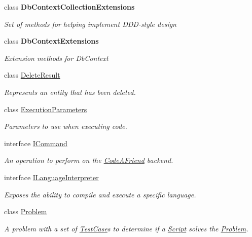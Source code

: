 \begin{DoxyCompactItemize}
\item 
class {\bfseries Db\+Context\+Collection\+Extensions}
\begin{DoxyCompactList}\small\item\em Set of methods for helping implement D\+D\+D-\/style design \end{DoxyCompactList}\item 
class {\bfseries Db\+Context\+Extensions}
\begin{DoxyCompactList}\small\item\em Extension methods for Db\+Context \end{DoxyCompactList}\item 
class \mbox{\hyperlink{class_code_a_friend_1_1_data_model_1_1_delete_result}{Delete\+Result}}
\begin{DoxyCompactList}\small\item\em Represents an entity that has been deleted. \end{DoxyCompactList}\item 
class \mbox{\hyperlink{class_code_a_friend_1_1_data_model_1_1_execution_parameters}{Execution\+Parameters}}
\begin{DoxyCompactList}\small\item\em Parameters to use when executing code. \end{DoxyCompactList}\item 
interface \mbox{\hyperlink{interface_code_a_friend_1_1_data_model_1_1_i_command}{I\+Command}}
\begin{DoxyCompactList}\small\item\em An operation to perform on the \mbox{\hyperlink{namespace_code_a_friend}{Code\+A\+Friend}} backend. \end{DoxyCompactList}\item 
interface \mbox{\hyperlink{interface_code_a_friend_1_1_data_model_1_1_i_language_interpreter}{I\+Language\+Interpreter}}
\begin{DoxyCompactList}\small\item\em Exposes the ability to compile and execute a specific language. \end{DoxyCompactList}\item 
class \mbox{\hyperlink{class_code_a_friend_1_1_data_model_1_1_problem}{Problem}}
\begin{DoxyCompactList}\small\item\em A problem with a set of \mbox{\hyperlink{class_code_a_friend_1_1_data_model_1_1_test_case}{Test\+Case}}s to determine if a \mbox{\hyperlink{class_code_a_friend_1_1_data_model_1_1_script}{Script}} solves the \mbox{\hyperlink{class_code_a_friend_1_1_data_model_1_1_problem}{Problem}}. \end{DoxyCompactList}\item 

\end{DoxyCompactItemize}
